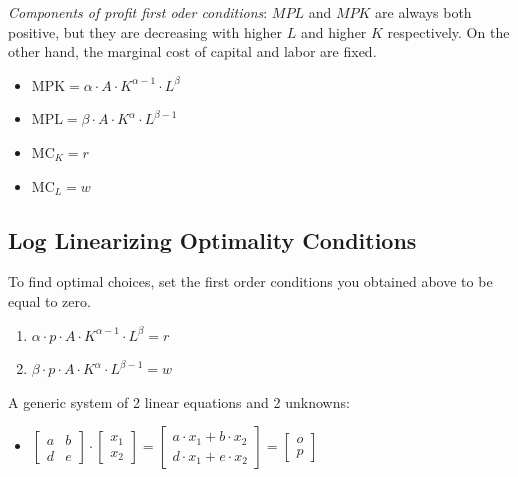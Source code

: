 \documentclass[
]{book}
\providecommand{\tightlist}{%
  \setlength{\itemsep}{0pt}\setlength{\parskip}{0pt}}
\begin{document}
\emph{Components of profit first oder conditions}: \(MPL\) and \(MPK\) are always
both positive, but they are decreasing with higher \(L\) and higher \(K\)
respectively. On the other hand, the marginal cost of capital and labor
are fixed.

\begin{itemize}
\item
  \(\displaystyle \textrm{MPK}=\alpha \cdot A\cdot K^{\alpha -1} \cdot L^{\beta }\)
\item
  \(\displaystyle \textrm{MPL}=\beta \cdot A\cdot K^{\alpha } \cdot L^{\beta -1}\)
\item
  \(\displaystyle {\textrm{MC}}_K =r\)
\item
  \(\displaystyle {\textrm{MC}}_L =w\)
\end{itemize}

\hypertarget{log-linearizing-optimality-conditions}{%
\subsection{Log Linearizing Optimality Conditions}\label{log-linearizing-optimality-conditions}}

To find optimal choices, set the first order conditions you obtained
above to be equal to zero.

\begin{enumerate}
\def\labelenumi{\arabic{enumi}.}
\item
  \(\displaystyle \alpha \cdot p\cdot A\cdot K^{\alpha -1} \cdot L^{\beta } =r\)
\item
  \(\displaystyle \beta \cdot p\cdot A\cdot K^{\alpha } \cdot L^{\beta -1} =w\)
\end{enumerate}

A generic system of 2 linear equations and 2 unknowns:

\begin{itemize}
\tightlist
\item
  \(\displaystyle \left\lbrack \begin{array}{cc} a & b\\ d & e \end{array}\right\rbrack \cdot \left\lbrack \begin{array}{c} x_1 \\ x_2 \end{array}\right\rbrack =\left\lbrack \begin{array}{cc} a\cdot x_1 +b\cdot x_2 \\ d\cdot x_1 +e\cdot x_2 \end{array}\right\rbrack =\left\lbrack \begin{array}{c} o\\ p \end{array}\right\rbrack\)
\end{itemize}
\end{document}
